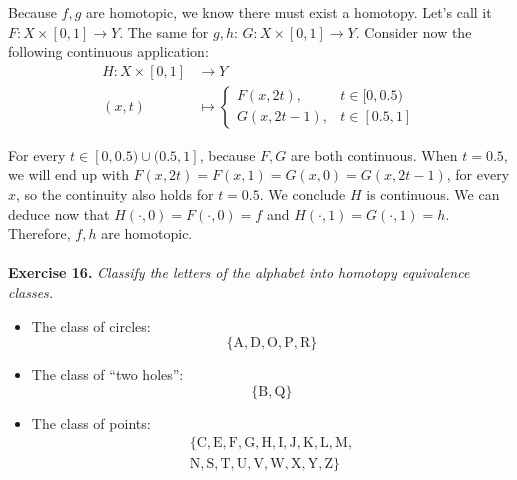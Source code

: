 \documentclass{article}
\begin{document}
    Because $f, g$ are homotopic, we know there must exist a homotopy.
    Let's call it $F \colon X \times [0, 1] \to Y$.
    The same for $g, h$:
    $G \colon X \times [0, 1] \to Y$.
    Consider now the following continuous application:
    \begin{align*}
        H \colon X \times [0, 1] &\longrightarrow Y \\
        (x, t) &\mapsto \begin{cases}
            F(x, 2t), &t \in [0, 0.5) \\
            G(x, 2t - 1), &t \in [0.5, 1]
        \end{cases}
    \end{align*}

    For every $t \in [0, 0.5) \cup (0.5, 1]$, because $F, G$ are both continuous.
    When $t = 0.5$, we will end up with $F(x, 2t) = F(x, 1) = G(x, 0) = G(x, 2t - 1)$, for every $x$, so the continuity also holds for $t = 0.5$.
    We conclude $H$ is continuous.
    We can deduce now that $H(\cdot, 0) = F(\cdot, 0) = f$ and $H(\cdot, 1) = G(\cdot, 1) = h$.
    Therefore, $f, h$ are homotopic. \\\\

    \noindent\textbf{Exercise 16.} \textit{Classify the letters of the alphabet into homotopy equivalence classes.} \\  

    \begin{itemize}
        \item The class of circles:
            \Huge
            $$\{\textrm{A}, \textrm{D}, \textrm{O}, \textrm{P}, \textrm{R}\}$$
            \normalsize

        \item The class of ``two holes'':
            \Huge
            $$\{\textrm{B}, \textrm{Q}\}$$
            \normalsize
        
        \item The class of points:
            \Huge
            \begin{gather*}
                \{\textrm{C}, \textrm{E}, \textrm{F}, \textrm{G}, \textrm{H}, \textrm{I}, \textrm{J}, \textrm{K}, \textrm{L}, \textrm{M},\\ \textrm{N}, \textrm{S}, \textrm{T}, \textrm{U}, \textrm{V}, \textrm{W}, \textrm{X}, \textrm{Y}, \textrm{Z}\}
            \end{gather*}
            \normalsize
    \end{itemize}
\end{document}
